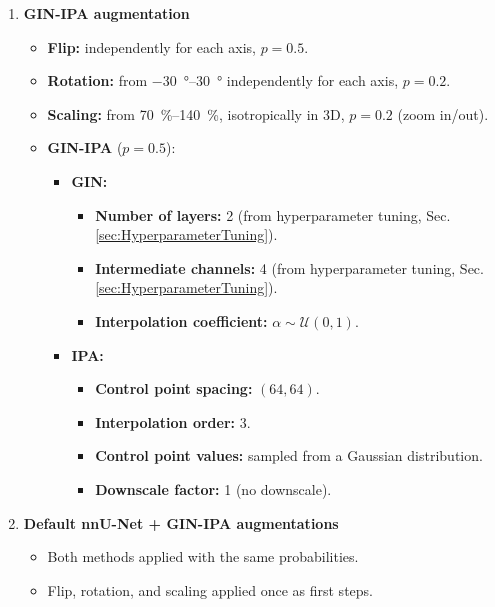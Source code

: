 \begin{enumerate}
    \item \textbf{GIN-IPA augmentation}
    \begin{itemize}
        \item \textbf{Flip:} independently for each axis, $p=0.5$.
        \item \textbf{Rotation:} from \qtyrange{-30}{30}{\degree} independently for each axis, $p=0.2$.
        \item \textbf{Scaling:} from \qtyrange{70}{140}{\percent}, isotropically in 3D, $p=0.2$ (zoom in/out).
        \item \textbf{GIN-IPA} ($p=0.5$):
        \begin{itemize}
            \item \textbf{GIN:}
            \begin{itemize}[label=$\diamond$]
                \item \textbf{Number of layers:} \num{2} (from hyperparameter tuning, Sec.\,\ref{sec:HyperparameterTuning}).
                \item \textbf{Intermediate channels:} \num{4} (from hyperparameter tuning, Sec.\,\ref{sec:HyperparameterTuning}).
                \item \textbf{Interpolation coefficient:} $\alpha \sim \mathcal{U}(0, 1)$.
            \end{itemize}
            \item \textbf{IPA:}
            \begin{itemize}[resume*]
                \item \textbf{Control point spacing:} $(64, 64)$.
                \item \textbf{Interpolation order:} \num{3}.
                \item \textbf{Control point values:} sampled from a Gaussian distribution.
                \item \textbf{Downscale factor:} \num{1} (no downscale).
            \end{itemize}
        \end{itemize}
    \end{itemize}

    \item \textbf{Default nnU-Net + GIN-IPA augmentations}
    \begin{itemize}
        \item Both methods applied with the same probabilities.
        \item Flip, rotation, and scaling applied once as first steps.
    \end{itemize}

\end{enumerate}

